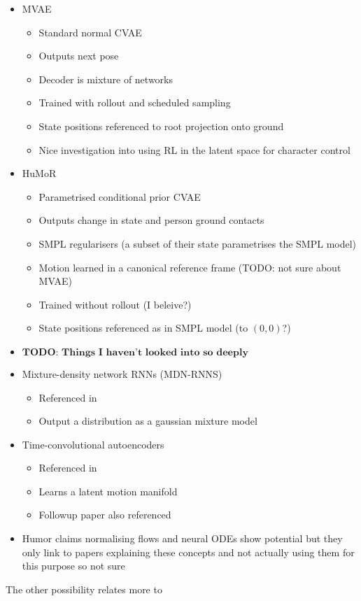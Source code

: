 \begin{itemize}
    \item MVAE \cite{humor}
    \begin{itemize}
        \item Standard normal CVAE
        \item Outputs next pose
        \item Decoder is mixture of networks
        \item Trained with rollout and scheduled sampling
        \item State positions referenced to root projection onto ground
        \item Nice investigation into using RL in the latent space for character control
    \end{itemize}
    \item HuMoR \cite{humor}
    \begin{itemize}
        \item Parametrised conditional prior CVAE
        \item Outputs change in state and person ground contacts
        \item SMPL regularisers (a subset of their state parametrises the SMPL model)
        \item Motion learned in a canonical reference frame (TODO: not sure about MVAE)
        \item Trained without rollout (I beleive?) 
        \item State positions referenced as in SMPL model (to $(0,0)$?)
    \end{itemize}

    \item $\textbf{TODO: Things I haven't looked into so deeply}$
    \item Mixture-density network RNNs (MDN-RNNS)
    \begin{itemize}
        \item Referenced in \cite{MVAE}
        \item Output a distribution as a gaussian mixture model
    \end{itemize}
    \item Time-convolutional autoencoders
    \begin{itemize}
        \item Referenced in \cite{MVAE}
        \item Learns a latent motion manifold
        \item Followup paper also referenced
    \end{itemize}
    \item Humor claims normalising flows and neural ODEs show potential but they only link to papers explaining these concepts and not actually using them for this purpose so not sure
\end{itemize}


The other possibility relates more to 